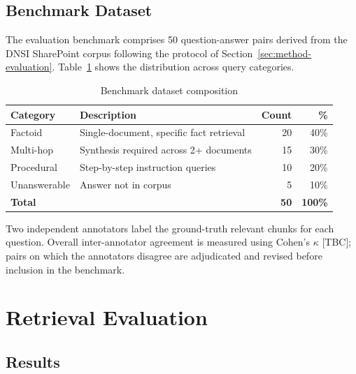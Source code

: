 \subsection{Benchmark Dataset}

The evaluation benchmark comprises 50 question-answer pairs derived from the DNSI SharePoint corpus following the protocol of Section~\ref{sec:method-evaluation}. Table~\ref{tab:benchmark-composition} shows the distribution across query categories.

\begin{table}[H]
\centering
\caption{Benchmark dataset composition}
\label{tab:benchmark-composition}
\begin{tabularx}{\textwidth}{@{}lXrr@{}}
\toprule
\textbf{Category} & \textbf{Description} & \textbf{Count} & \textbf{\%} \\
\midrule
Factoid & Single-document, specific fact retrieval & 20 & 40\% \\
Multi-hop & Synthesis required across 2+ documents & 15 & 30\% \\
Procedural & Step-by-step instruction queries & 10 & 20\% \\
Unanswerable & Answer not in corpus & 5 & 10\% \\
\midrule
\textbf{Total} & & \textbf{50} & \textbf{100\%} \\
\bottomrule
\end{tabularx}
\end{table}

Two independent annotators label the ground-truth relevant chunks for each question. Overall inter-annotator agreement is measured using Cohen's $\kappa$ \citep{Cohen1960Kappa} [TBC]; pairs on which the annotators disagree are adjudicated and revised before inclusion in the benchmark.


\section{Retrieval Evaluation}
\label{sec:eval-retrieval}

\subsection{Results}

